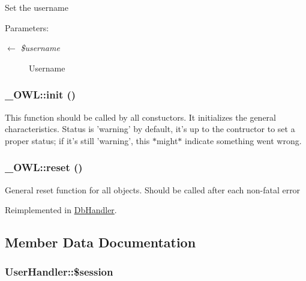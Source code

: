 Set the username \begin{Desc}
\item[Parameters:]
\begin{description}
\item[\mbox{$\leftarrow$} {\em \$username}]Username \end{description}
\end{Desc}
\hypertarget{class__OWL_e0ef3ded56e8a6b34b6461e5a721cd3e}{
\subsubsection{\setlength{\rightskip}{0pt plus 5cm}\_\-OWL::init ()}}
\label{class__OWL_e0ef3ded56e8a6b34b6461e5a721cd3e}


This function should be called by all constuctors. It initializes the general characteristics. Status is 'warning' by default, it's up to the contructor to set a proper status; if it's still 'warning', this $\ast$might$\ast$ indicate something went wrong. \hypertarget{class__OWL_2f2a042bcf31965194c03033df0edc9b}{
\subsubsection{\setlength{\rightskip}{0pt plus 5cm}\_\-OWL::reset ()}}
\label{class__OWL_2f2a042bcf31965194c03033df0edc9b}


General reset function for all objects. Should be called after each non-fatal error 

Reimplemented in \hyperlink{classDbHandler_9982df4830f05803935bb31bac7fae3d}{DbHandler}.

\subsection{Member Data Documentation}
\hypertarget{classUserHandler_f097b7fd1ee085b46a6c34e071508a7f}{
\subsubsection{\setlength{\rightskip}{0pt plus 5cm}UserHandler::\$session}}
\label{classUserHandler_f097b7fd1ee085b46a6c34e071508a7f}


